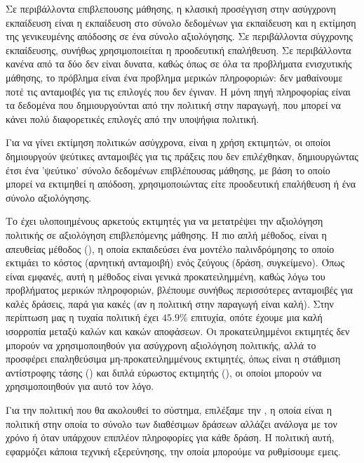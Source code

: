 Σε περιβάλλοντα επιβλεπουσης μάθησης, η κλασική προσέγγιση στην ασύγχρονη εκπαίδευση είναι η εκπαίδευση στο σύνολο δεδομένων για εκπαίδευση και η εκτίμηση της γενικευμένης απόδοσης σε ένα σύνολο αξιολόγησης. Σε περιβάλλοντα σύγχρονης εκπαίδευσης, συνήθως χρησιμοποιείται η προοδευτική επαλήθευση. Σε περιβάλλοντα  κανένα από τα δύο δεν είναι δυνατα, καθώς όπως σε όλα τα προβλήματα ενισχυτικής μάθησης, το πρόβλημα είναι ένα προβλημα μερικών πληροφοριών: δεν μαθαίνουμε ποτέ τις ανταμοιβές για τις επιλογές που δεν έγιναν. Η μόνη πηγή πληροφορίας είναι τα δεδομένα	που δημιουργούνται από την πολιτική στην παραγωγή, που μπορεί να κάνει πολύ διαφορετικές επιλογές από την υποψήφια πολιτική.

Για να γίνει εκτίμηση πολιτικών  ασύγχρονα, είναι η χρήση εκτιμητών, οι οποίοι δημιουργούν ψεύτικες ανταμοιβές για τις πράξεις που δεν επιλέχθηκαν, δημιουργώντας έτσι ένα 'ψεύτικο' σύνολο δεδομένων επιβλέπουσας μάθησης, με βάση το οποίο μπορεί να εκτιμηθεί η απόδοση, χρησιμοποιώντας είτε προοδευτική επαλήθευση ή ένα σύνολο αξιολόγησης.

Το   έχει υλοποιημένους αρκετούς εκτιμητές για να μετατρέψει την αξιολόγηση πολιτικής σε αξιολόγηση επιβλεπόμενης μάθησης. Η πιο απλή μέθοδος, είναι η απευθείας μέθοδος (), η οποία εκπαιδεύσει ένα μοντέλο παλινδρόμησης το οποίο εκτιμάει το κόστος (αρνητική ανταμοιβή) ενός ζεύγους (δράση, συγκείμενο). Όπως είναι εμφανές, αυτή η μέθοδος είναι γενικά προκατειλημμένη, καθώς λόγω του προβλήματος μερικών πληροφοριών, βλέπουμε συνήθως περισσότερες ανταμοιβές για καλές δράσεις, παρά για κακές (αν η πολιτική στην παραγωγή είναι καλή). Στην περίπτωση μας η τυχαία πολιτική έχει $45.9\%$ επιτυχία, οπότε έχουμε μια καλή ισορροπία μεταξύ καλών και κακών αποφάσεων. Οι προκατειλημμένοι εκτιμητές δεν μπορούν να χρησιμοποιηθούν για ασύγχρονη αξιολόγηση πολιτικής, αλλά το  προσφέρει επαληθεύσιμα μη-προκατειλημμένους εκτιμητές, όπως είναι η στάθμιση αντίστροφης τάσης () και διπλά εύρωστος εκτιμητής (),  οι οποίοι μπορούν να χρησιμοποιηθούν για αυτό τον λόγο.

Για την πολιτική που θα ακολουθεί το σύστημα, επιλέξαμε την , η οποία είναι
η πολιτική στην οποία το σύνολο των διαθέσιμων δράσεων αλλάζει ανάλογα με τον χρόνο ή όταν υπάρχουν επιπλέον πληροφορίες για κάθε δράση. Η πολιτική αυτή, εφαρμόζει κάποια τεχνική εξερεύνησης, την οποία μπορούμε να ρυθμίσουμε εμεις.

